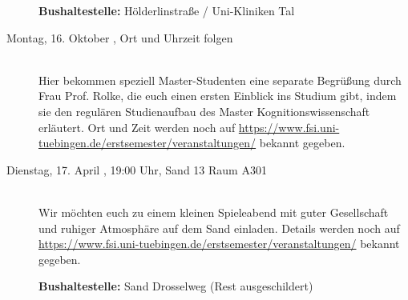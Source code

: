 \begin{description}
 \textbf{Bushaltestelle:} Hölderlinstraße / Uni-Kliniken Tal
\fi 

\ifkogwiss
\ifmaster
\item[Montag, 16. Oktober \Jahr, Ort und Uhrzeit folgen]\ \\
Hier bekommen speziell Master-Studenten eine separate Begrüßung durch Frau Prof. Rolke, die euch einen ersten Einblick ins Studium gibt, indem sie den regulären Studienaufbau des Master Kognitionswissenschaft erläutert. Ort und Zeit werden noch auf \url{https://www.fsi.uni-tuebingen.de/erstsemester/veranstaltungen/} bekannt gegeben.
\fi
\fi 


\item[Dienstag, 17. April \Jahr, 19:00 Uhr, Sand 13 Raum A301]\ \\
Wir möchten euch zu einem kleinen Spieleabend mit guter Gesellschaft und ruhiger Atmosphäre auf dem Sand einladen. Details werden noch auf \url{https://www.fsi.uni-tuebingen.de/erstsemester/veranstaltungen/} bekannt gegeben.

\textbf{Bushaltestelle:} Sand Drosselweg (Rest ausgeschildert) 



   
  
   



\end{description}
